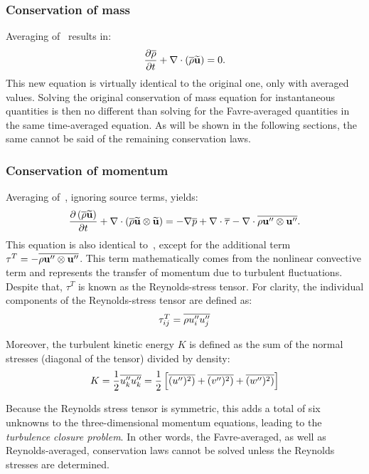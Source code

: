 \subsubsection{Conservation of mass}
%
Averaging of~ results in:
\begin{equation}
     \frac{\partial \overline{\rho}}{\partial t} 
        + \nabla\cdot \left(
            \overline{\rho}\widetilde{\mathbf{u}}
        \right) = 0
    \label{eq:rmass}.
\end{equation}
This new equation is virtually identical to the original one, only with averaged values. Solving the original conservation of mass equation for instantaneous quantities is then no different than solving for the Favre-averaged quantities in the same time-averaged equation. As will be shown in the following sections, the same cannot be said of the remaining conservation laws.
%
\subsubsection{Conservation of momentum}
%
Averaging of~, ignoring source terms, yields:
\begin{equation}
     \frac{\partial \left(\overline{\rho}\widetilde{\mathbf{u}}\right)}{\partial t} 
        + \nabla\cdot \left(
            \overline{\rho}\widetilde{\mathbf{u}}\otimes\widetilde{\mathbf{u}}
        \right) =
        - \nabla\overline{p}
        + \nabla\cdot\overline{\tau}
        - \nabla\cdot
            \overline{\rho \mathbf{u}''\otimes\mathbf{u}''}
    \label{eq:rmom}.
\end{equation}
This equation is also identical to~, except for the additional term $\tau^T =  -\overline{\rho \mathbf{u}''\otimes\mathbf{u}''}$. This term mathematically comes from the nonlinear convective term and represents the transfer of momentum due to turbulent fluctuations. Despite that, $\tau^T$ is known as the Reynolds-stress tensor. For clarity, the individual components of the Reynolds-stress tensor are defined as:
\begin{equation*}
    \tau^T_{ij} = \overline{\rho u_i''u_j''}
\end{equation*}

Moreover, the turbulent kinetic energy $K$ is defined as the sum of the normal stresses (diagonal of the tensor) divided by density:
\begin{equation*}
    K = \frac{1}{2}\overline{u_k''u_k''} = \frac{1}{2}\left[
        \overline{(u'')^2)} + \overline{(v'')^2)} + \overline{(w'')^2)}
    \right]
\end{equation*}

Because the Reynolds stress tensor is symmetric, this adds a total of six unknowns to the three-dimensional momentum equations, leading to the \textit{turbulence closure problem}. In other words, the Favre-averaged, as well as Reynolds-averaged, conservation laws cannot be solved unless the Reynolds stresses are determined.
%
